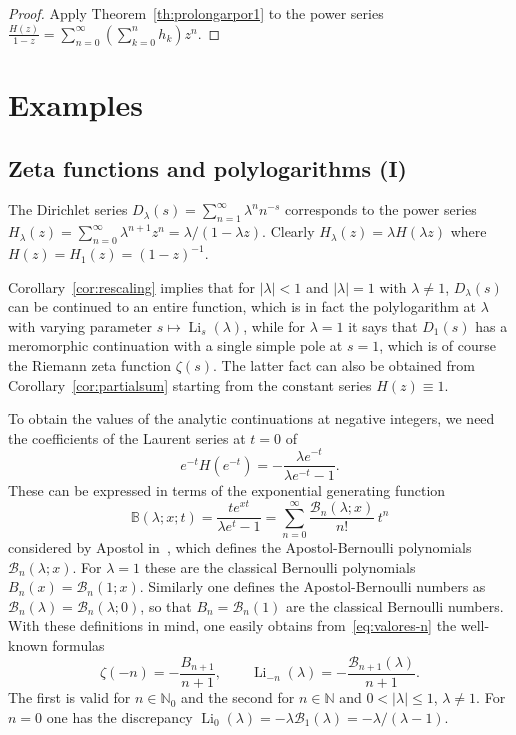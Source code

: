\documentclass[11pt,a4paper]{amsart}
\newcommand{\N}{\mathbb{N}}
\newcommand{\AB}{\mathcal{B}}
\newcommand{\B}{\mathbb{B}}
\newcommand{\Li}{\operatorname{Li}}
\theoremstyle{plain}
\theoremstyle{plain}
\theoremstyle{plain}
\theoremstyle{definition}
\theoremstyle{remark}
\begin{document}
\begin{proof}
Apply Theorem~\ref{th:prolongarpor1} to the power series
$
  \frac{H(z)}{1-z} = \sum_{n=0}^{\infty} \left( \sum_{k=0}^{n} h_{k}\right)z^{n}.
$
\end{proof}


\section{Examples}
\label{sec:examples}

\subsection{Zeta functions and polylogarithms (I)}
\label{subsec:polylog1}

The Dirichlet series $D_{\lambda}(s) = \sum_{n=1}^{\infty} \lambda^{n} n^{-s}$  corresponds to the power series $H_{\lambda}(z) = \sum_{n=0}^{\infty} \lambda^{n+1} z^{n} = \lambda/(1 - \lambda z).$ Clearly $H_{\lambda}(z) = \lambda H(\lambda z)$ where $H(z) = H_{1}(z) = (1-z)^{-1}$.

Corollary~\ref{cor:rescaling} implies that for $|\lambda| < 1$ and $|\lambda| = 1$ with $\lambda \neq 1$, $D_{\lambda}(s)$ can be continued to an entire function, which is in fact the polylogarithm at $\lambda$ with varying parameter $s \mapsto \Li_{s}(\lambda)$, while for $\lambda = 1$ it says that $D_{1}(s)$ has a meromorphic continuation with a single simple pole at $s=1$, which is of course the Riemann zeta function $\zeta(s)$. The latter fact can also be obtained from Corollary~\ref{cor:partialsum} starting from the constant series $H(z) \equiv 1$.

To obtain the values of the analytic continuations at negative integers, we need the coefficients of the Laurent series at $t=0$ of 
\[
  e^{-t} H(e^{-t}) = -\frac{\lambda e^{-t}}{\lambda e^{-t} - 1}.
\]
These can be expressed in terms of the exponential generating function
\[
  \B(\lambda;x;t) = \frac{t e^{xt}}{\lambda e^{t} - 1}
  = \sum_{n=0}^{\infty} \frac{\AB_n(\lambda;x)}{n!} \,t^{n}
\]
considered by Apostol in~\cite{Apostol-Lerch}, which defines the Apostol-Bernoulli polynomials $\AB_n(\lambda;x)$. For $\lambda = 1$ these are the classical Bernoulli polynomials $B_{n}(x) = \AB_n(1;x)$. Similarly one defines the Apostol-Bernoulli numbers as $\AB_n(\lambda) = \AB_n(\lambda;0)$, so that $B_{n} = \AB_n(1)$ are the classical Bernoulli numbers.
With these definitions in mind, one easily obtains from~\eqref{eq:valores-n} the well-known formulas
\[
  \zeta(-n)
  =-\frac{B_{n+1}}{n+1},
  \qquad
  \Li_{-n}(\lambda)
  = -\frac{\AB_{n+1}(\lambda)}{n+1}.
\]
The first is valid for $n \in \N_{0}$ and the second for $n \in \N$ and $0 < |\lambda| \leq 1$, $\lambda \neq 1$. For $n=0$ one has the discrepancy $\Li_{0}(\lambda) = -\lambda \AB_{1}(\lambda) = -\lambda/(\lambda-1)$.
\end{document}
